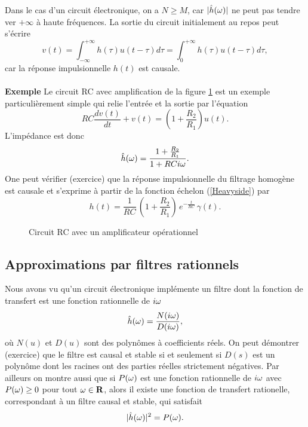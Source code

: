 Dans le cas d'un circuit \'electronique, on a 
$N \geq M$, car $|\hat h({\omega})|$ ne peut pas tendre ver $+\infty$ \`a
haute fr\'equences.
La sortie du circuit initialement au repos peut s'\'ecrire
\[
v (t) = \int_{-\infty}^{+\infty} h(\tau) u(t-\tau) d\tau =
\int_{0}^{+\infty} h(\tau) u(t-\tau) d\tau ,
\]
car la r\'eponse impulsionnelle $h(t)$ est causale.
\\
\\
{\bf Exemple}
Le circuit RC avec amplification 
de la figure \ref{circuit-fig} est un exemple particuli\`erement
simple qui relie l'entr\'ee et la sortie par l'\'equation
\[
RC \frac {d v (t)}{dt} + v (t) = (1 + \frac {R_2} {R_1})u (t).
\]
L'imp\'edance est donc
\[
\hat h({\omega}) = \frac {1 + \frac {R_2} {R_1}} {1 + RC i {\omega}} .
\]
One peut v\'erifier (exercice) que la r\'eponse impulsionnelle 
du filtrage homog\`ene est causale et s'exprime \`a partir
de la fonction \'echelon (\ref{Heavyside}) par
\[
h(t) = \frac 1 {RC} \,(1 + \frac {R_2} {R_1})\, 
e^{-\frac {t}{RC}} \, \gamma (t) .
\]

\begin{figure}[bhtp]
\centerline{
	\leavevmode{}}
\caption{Circuit RC avec un amplificateur op\'erationnel}
\label{circuit-fig}
\end{figure}


\subsection{Approximations par filtres rationnels}

Nous avons vu qu'un circuit \'electronique
impl\'emente 
un filtre dont la fonction de transfert
est une fonction rationnelle de $i {\omega}$
\begin{equation}
\label{rationnel}
\hat h({\omega}) = \frac {N(i{\omega})} {D(i{\omega})} ,
\end{equation}
o\`u $N(u)$ et $D(u)$ sont des polyn\^omes \`a coefficients
r\'eels. 
On peut d\'emontrer (exercice) que le filtre est causal et
stable si et seulement si $D(s)$ est un polyn\^ome dont les
racines ont des parties r\'eelles strictement n\'egatives. 
Par ailleurs on montre aussi que si 
$P({\omega})$ est une fonction
rationnelle de $i {\omega}$ avec $P({\omega}) \geq 0$ pour tout ${\omega} \in {\bf{R}}$,
alors il existe une fonction de transfert rationelle, 
correspondant \`a un filtre causal et
stable, qui satisfait
\[
|\hat h ({\omega})|^2 = P({\omega}).
\]

